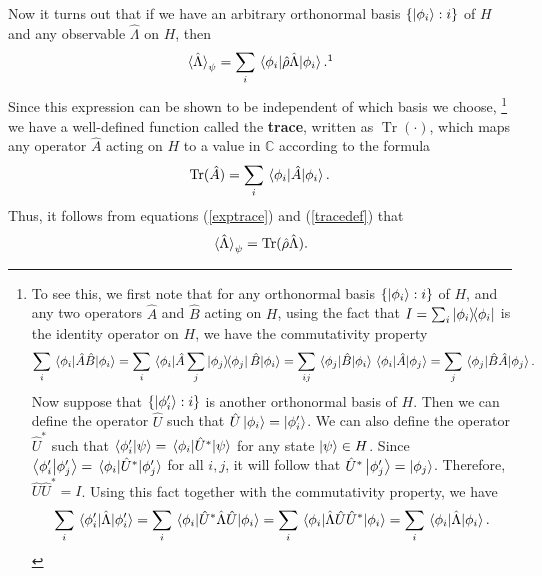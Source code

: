 \documentclass[letter, 12pt]{turabian-thesis}
\theoremstyle{hypothesis}
\let\origfootnote\footnote %
\renewcommand{\footnote}[1]{%
\noindent %
\origfootnote{#1}}
\renewcommand{\Tr}{\operatorname{Tr}}
\begin{document}
  Now it turns out that if we have an arbitrary orthonormal basis $\{\ket{\phi_i}:i\}$ of $H$ and any observable $\hat{\Lambda}$ on $H$, then 
\begin{equation}\label{exptrace}\ev*{\hat{\Lambda}}_\psi=\sum_{i}\ev*{\hat{\rho}\hat{\Lambda}}{\phi_i}.\protect\footnotemark
\end{equation}
Since this expression can be shown to be independent of
 which basis we choose,\footnote{To see this, we first note that for any orthonormal basis $\{\ket{\phi_i}:i\}$ of $H$, and any two operators $\hat{A}$ and $\hat{B}$ acting on $H$, using the fact that $I=\sum_i\dyad{\phi_i}$ is the identity operator on $H$, we have the commutativity property $$\sum_i\ev*{\hat{A}\hat{B}}{\phi_i}=\sum_i\ev*{\hat{A}\sum_j\dyad{\phi_j}\hat{B}}{\phi_i}=\sum_{ij}\mel*{\phi_j}{\hat{B}}{\phi_i}\mel*{\phi_i}{\hat{A}}{\phi_j}=\sum_j\ev*{\hat{B}\hat{A}}{\phi_j}.$$ Now suppose that $\{\ket{\phi_i'}:i\}$  is another orthonormal basis of $H$. Then we can define the operator $\hat{U}$ such that $\hat{U}\ket{\phi_i}=\ket{\phi_i'}$. We can also define the operator $\hat{U}^*$ such that $\ip{\phi_i'}{\psi}=\mel*{\phi_i}{\hat{U}^*}{\psi}$ for any state $\ket{\psi}\in H$. Since $\ip{\phi_i'}{\phi_j'}=\mel*{\phi_i}{\hat{U}^*}{\phi_j'}$ for all $i, j$, it will follow that  $\hat{U}^*\ket{\phi_j'}=\ket{\phi_j}$. Therefore, $\hat{U}\hat{U}^*=I$. Using this fact together with the commutativity property, we have 
$$\sum_i \ev*{\hat{\Lambda}}{\phi_i'}= \sum_i\ev*{\hat{U}^*\hat{\Lambda}\hat{U}}{\phi_i}
=\sum_i\ev*{\hat{\Lambda}\hat{U}\hat{U}^*}{\phi_i}=\sum_i\ev*{\hat{\Lambda}}{\phi_i}.$$} 
 we have a well-defined function called the \textbf{trace}, written as $\Tr(\cdot)$, which maps any operator $\hat{A}$ acting on $H$ to a value in $\mathbb{C}$ according to the formula
\begin{equation}\Tr (\hat{A})=\sum_i \ev*{\hat{A}}{\phi_i}.\label{tracedef}\end{equation}
Thus, it follows from equations (\ref{exptrace}) and (\ref{tracedef}) that 
\begin{equation}
\ev*{\hat{\Lambda}}_\psi=\Tr (\hat{\rho}\hat{\Lambda}\label{traceev}).
\end{equation}
\end{document}
